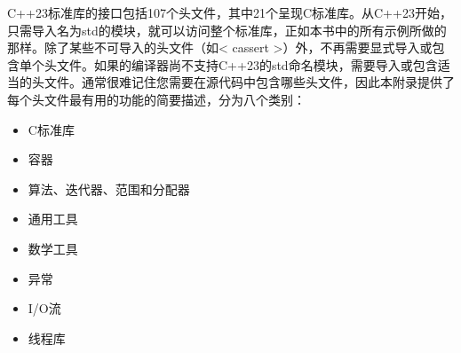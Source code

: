 C++23标准库的接口包括107个头文件，其中21个呈现C标准库。从C++23开始，只需导入名为std的模块，就可以访问整个标准库，正如本书中的所有示例所做的那样。除了某些不可导入的头文件（如< cassert >）外，不再需要显式导入或包含单个头文件。如果的编译器尚不支持C++23的std命名模块，需要导入或包含适当的头文件。通常很难记住您需要在源代码中包含哪些头文件，因此本附录提供了每个头文件最有用的功能的简要描述，分为八个类别：

\begin{itemize}
\item
C标准库

\item
容器

\item
算法、迭代器、范围和分配器

\item
通用工具

\item
数学工具

\item
异常

\item
I/O流

\item
线程库
\end{itemize}
